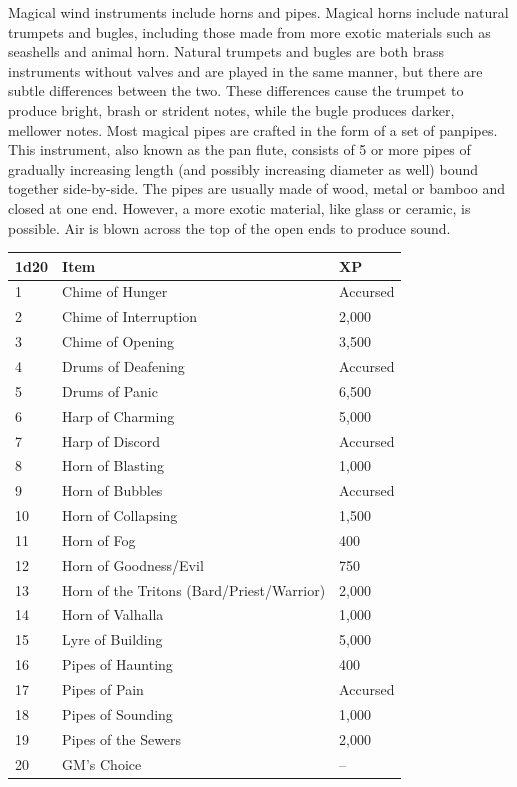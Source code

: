 \begin{multicols}{2}
Magical wind instruments include horns and pipes.  Magical horns include natural trumpets and bugles, including those made from more exotic materials such as seashells and animal horn.  Natural trumpets and bugles are both brass instruments without valves and are played in the same manner, but there are subtle differences between the two.  These differences cause the trumpet to produce bright, brash or strident notes, while the bugle produces darker, mellower notes.  Most magical pipes are crafted in the form of a set of panpipes.  This instrument, also known as the pan flute, consists of 5 or more pipes of gradually increasing length (and possibly increasing diameter as well) bound together side-by-side.  The pipes are usually made of wood, metal or bamboo and closed at one end. However, a more exotic material, like glass or ceramic, is possible.  Air is blown across the top of the open ends to produce sound. 

\noindent \begin{minipage}{\columnwidth}

\noindent \begin{tabular}{|p{}|p{}|p{}|}
\hline
1d20	& Item	& XP \\
\hline\hline
\rowcolor[gray]{0.9}1	& Chime of Hunger	& Accursed \\
2	& Chime of Interruption	& 2,000 \\
\rowcolor[gray]{0.9}3	& Chime of Opening	& 3,500 \\
4	& Drums of Deafening	& Accursed \\
\rowcolor[gray]{0.9}5	& Drums of Panic	& 6,500 \\
6	& Harp of Charming	& 5,000 \\
\rowcolor[gray]{0.9}7	& Harp of Discord	& Accursed \\
8	& Horn of Blasting	& 1,000 \\
\rowcolor[gray]{0.9}9	& Horn of Bubbles	& Accursed \\
10	& Horn of Collapsing	& 1,500 \\
\rowcolor[gray]{0.9}11	& Horn of Fog	& 400 \\
12	& Horn of Goodness/Evil	& 750 \\
\rowcolor[gray]{0.9}13	& Horn of the Tritons (Bard/Priest/Warrior)	& 2,000 \\
14	& Horn of Valhalla	& 1,000 \\
\rowcolor[gray]{0.9}15	& Lyre of Building	& 5,000 \\
16	& Pipes of Haunting	& 400 \\
\rowcolor[gray]{0.9}17	& Pipes of Pain	& Accursed \\
18	& Pipes of Sounding	& 1,000 \\
\rowcolor[gray]{0.9}19	& Pipes of the Sewers	& 2,000 \\
20	& GM's Choice	& -- \\
\hline
\end{tabular}


\end{minipage}
\end{multicols}
